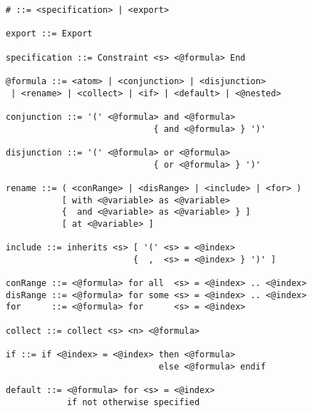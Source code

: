 \begin{figure}[h]
\begin{lstlisting}[language=BNF,basicstyle=\linespread{0.8}\ttfamily,
                   captionpos=t,caption=
   {Verbatim display of the grammar file that is used to generate the parser for
    CAnDL.
    The file is in a custom version of Backus–Naur form.
    In the parse tree, all expressions that start with ``{@}'' are
    automatically expanded.
    The character ``\#'' marks the top-level language construct.
    Any expression that does not ultimately become part of this construct
    constitutes a syntax error.\parfillskip=0pt}]
# ::= <specification> | <export>

export ::= Export

specification ::= Constraint <s> <@formula> End

@formula ::= <atom> | <conjunction> | <disjunction>
 | <rename> | <collect> | <if> | <default> | <@nested>

conjunction ::= '(' <@formula> and <@formula>
                             { and <@formula> } ')'

disjunction ::= '(' <@formula> or <@formula>
                             { or <@formula> } ')'

rename ::= ( <conRange> | <disRange> | <include> | <for> )
           [ with <@variable> as <@variable>
           {  and <@variable> as <@variable> } ]
           [ at <@variable> ]

include ::= inherits <s> [ '(' <s> = <@index>
                         {  ,  <s> = <@index> } ')' ]

conRange ::= <@formula> for all  <s> = <@index> .. <@index>
disRange ::= <@formula> for some <s> = <@index> .. <@index>
for      ::= <@formula> for      <s> = <@index>

collect ::= collect <s> <n> <@formula>

if ::= if <@index> = <@index> then <@formula>
                              else <@formula> endif

default ::= <@formula> for <s> = <@index>
            if not otherwise specified
\end{lstlisting}
\end{figure}
